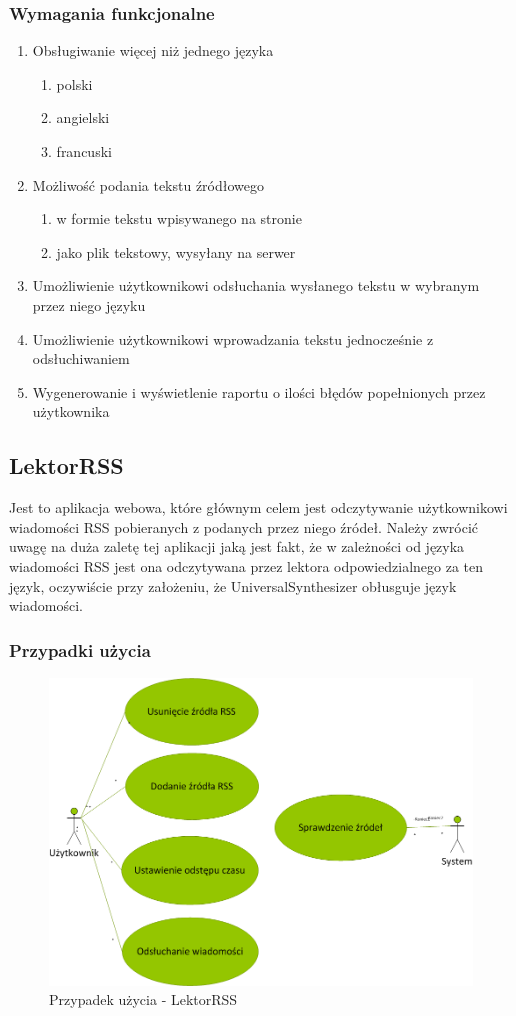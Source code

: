 \subsubsection{Wymagania funkcjonalne}
\begin{enumerate}
	\item Obsługiwanie więcej niż jednego języka
		\begin{enumerate}
			\item polski
			\item angielski
			\item francuski
		\end{enumerate}
	\item Możliwość podania tekstu źródłowego
		\begin{enumerate}
			\item w formie tekstu wpisywanego na stronie
			\item jako plik tekstowy, wysyłany na serwer
		\end{enumerate}
	\item Umożliwienie użytkownikowi odsłuchania wysłanego tekstu w wybranym przez niego języku
	\item Umożliwienie użytkownikowi wprowadzania tekstu jednocześnie z odsłuchiwaniem
	\item Wygenerowanie i wyświetlenie raportu o ilości błędów popełnionych przez użytkownika
\end{enumerate}
\subsection{LektorRSS}
Jest to aplikacja webowa, które głównym celem jest odczytywanie użytkownikowi wiadomości RSS pobieranych z podanych przez niego źródeł. Należy zwrócić uwagę na duża zaletę tej aplikacji jaką jest fakt, że w zależności od języka wiadomości RSS jest ona odczytywana przez lektora odpowiedzialnego za ten język, oczywiście przy założeniu, że UniversalSynthesizer obłusguje język wiadomości.
\subsubsection{Przypadki użycia}
\begin{figure}[!h]
	\centering
	\includegraphics[scale=0.45]{useCaseRSS.png} 
	\caption{Przypadek użycia - LektorRSS}
\end{figure}


